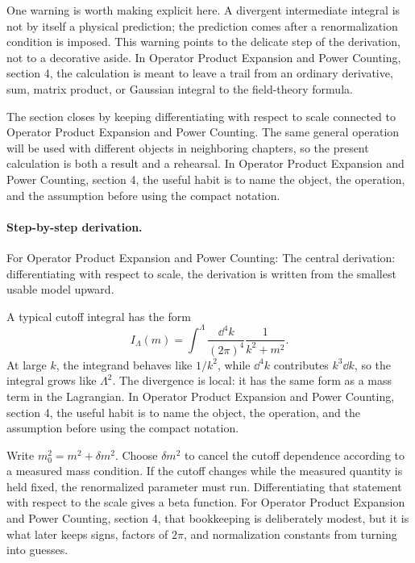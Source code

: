 One warning is worth making explicit here.  A divergent intermediate integral is not by itself a physical prediction; the prediction comes after a renormalization condition is imposed.  This warning points to the delicate step of the derivation, not to a decorative aside.  In Operator Product Expansion and Power Counting, section 4, the calculation is meant to leave a trail from an ordinary derivative, sum, matrix product, or Gaussian integral to the field-theory formula.

The section closes by keeping differentiating with respect to scale connected to Operator Product Expansion and Power Counting.  The same general operation will be used with different objects in neighboring chapters, so the present calculation is both a result and a rehearsal.  In Operator Product Expansion and Power Counting, section 4, the useful habit is to name the object, the operation, and the assumption before using the compact notation.



\paragraph{Step-by-step derivation.}

For Operator Product Expansion and Power Counting: The central derivation: differentiating with respect to scale, the derivation is written from the smallest usable model upward.

A typical cutoff integral has the form
\[
  I_\Lambda(m)=\int^{\Lambda}\frac{\dd^4k}{(2\pi)^4}\frac{1}{k^2+m^2}.
\]
At large \(k\), the integrand behaves like \(1/k^2\), while \(\dd^4k\) contributes \(k^3\dd k\), so the integral grows like \(\Lambda^2\).  The divergence is local: it has the same form as a mass term in the Lagrangian.  In Operator Product Expansion and Power Counting, section 4, the useful habit is to name the object, the operation, and the assumption before using the compact notation.

Write \(m_0^2=m^2+\delta m^2\).  Choose \(\delta m^2\) to cancel the cutoff dependence according to a measured mass condition.  If the cutoff changes while the measured quantity is held fixed, the renormalized parameter must run.  Differentiating that statement with respect to the scale gives a beta function.  For Operator Product Expansion and Power Counting, section 4, that bookkeeping is deliberately modest, but it is what later keeps signs, factors of \(2\pi\), and normalization constants from turning into guesses.

